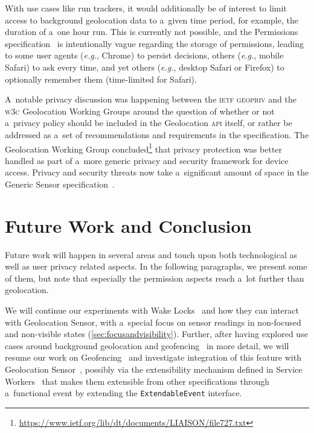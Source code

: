 \documentclass[sigconf,hyphens]{acmart}
\begin{document}
With use cases like run trackers, it would additionally be of interest
to limit access to background geolocation data to a~given time period,
for example, the duration of a~one hour run.
This is currently not possible, and the Permissions specification~\cite{lamouri2017permissions}
is intentionally vague regarding the storage of permissions,
leading to some user agents (\textit{e.g.}, Chrome) to persist decisions,
others (\textit{e.g.}, mobile Safari) to ask every time,
and yet others (\textit{e.g.}, desktop Safari or Firefox)
to optionally remember them (time-limited for Safari).

A~notable privacy discussion was happening between the \textsc{ietf} \textsc{geopriv}
and the \textsc{w3c} Geolocation Working Groups around the question of whether or not
a~privacy policy should be included in the Geolocation \textsc{api} itself,
or rather be addressed as a~set of recommendations and requirements in the specification.
The Geolocation Working Group
concluded\footnote{\url{https://www.ietf.org/lib/dt/documents/LIAISON/file727.txt}}
that privacy protection was better handled
as part of a~more generic privacy and security framework for device access.
Privacy and security threats now take a~significant amount of space
in the Generic Sensor specification~\cite{waldron2018genericsensor}.

\section{Future Work and Conclusion}

Future work will happen in several areas and touch upon both technological
as well as user privacy related aspects.
In the following paragraphs, we present some of them,
but note that especially the permission aspects reach a~lot further than geolocation.

We will continue our experiments with Wake Locks~\cite{steiner2018wakelock}
and how they can interact with Geolocation Sensor,
with a~special focus on sensor readings in non-focused and non-visible states
(\autoref{sec:focusandvisibility}).
Further, after having explored use cases around background geolocation
and geofencing~\cite{kostiainen2018geolocation} in more detail,
we will resume our work on Geofencing~\cite{kruisselbrink2017geofencing}
and investigate integration of this feature with Geolocation
Sensor~\cite{kostiainen2018geolocation}, possibly via the extensibility mechanism defined in Service
Workers~\cite{russell2017serviceworkers}
that makes them extensible from other specifications through a~functional event
by extending the \texttt{ExtendableEvent} interface.
\end{document}
